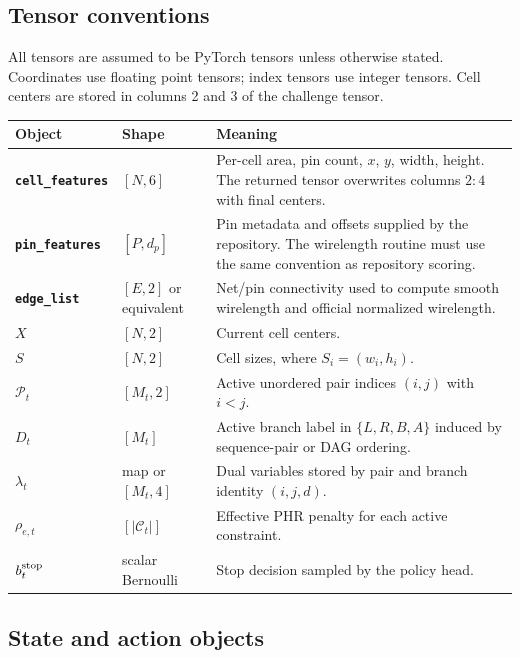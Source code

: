 \documentclass[11pt]{article}
\newcommand{\Pset}{\mathcal{P}}
\newcommand{\Constraint}{\mathcal{C}}
\begin{document}
\subsection{Tensor conventions}

All tensors are assumed to be PyTorch tensors unless otherwise stated. Coordinates use floating point tensors; index tensors use integer tensors. Cell centers are stored in columns 2 and 3 of the challenge tensor.

\begin{center}
\small
\begin{tabularx}{\textwidth}{>{\bfseries\color{navy}}p{}p{}Y}
\toprule
Object & Shape & Meaning \\
\midrule
\texttt{cell\_features} & $[N,6]$ & Per-cell area, pin count, $x$, $y$, width, height. The returned tensor overwrites columns $2:4$ with final centers. \\
\texttt{pin\_features} & $[P,d_p]$ & Pin metadata and offsets supplied by the repository. The wirelength routine must use the same convention as repository scoring. \\
\texttt{edge\_list} & $[E,2]$ or equivalent & Net/pin connectivity used to compute smooth wirelength and official normalized wirelength. \\
$X$ & $[N,2]$ & Current cell centers. \\
$S$ & $[N,2]$ & Cell sizes, where $S_i=(w_i,h_i)$. \\
$\Pset_t$ & $[M_t,2]$ & Active unordered pair indices $(i,j)$ with $i<j$. \\
$D_t$ & $[M_t]$ & Active branch label in $\{L,R,B,A\}$ induced by sequence-pair or DAG ordering. \\
$\lambda_t$ & map or $[M_t,4]$ & Dual variables stored by pair and branch identity $(i,j,d)$. \\
$\rho_{e,t}$ & $[|\Constraint_t|]$ & Effective PHR penalty for each active constraint. \\
$b^{\rm stop}_t$ & scalar Bernoulli & Stop decision sampled by the policy head. \\
\bottomrule
\end{tabularx}
\end{center}

\subsection{State and action objects}
\end{document}
